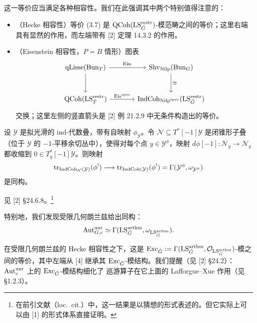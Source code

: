 这一等价应当满足各种相容性。我们在此强调其中两个特别值得注意的：
\begin{itemize}
  \item（Hecke 相容性）等价 (3.7) 是 $\mathrm{QCoh}(\mathrm{LS}^{\mathrm{restr}}_{\check{G}})$-模范畴之间的等价；这里右端具有显然的作用，而左端带有 [2] 定理 14.3.2 的作用。
  \item（Eisenstein 相容性，$P = B$ 情形）图表
  \begin{equation*}
    \begin{tikzcd}[column sep=large, row sep=large]
      \qLisse(\Bun_T) \arrow[r, "\Eis_!"] \arrow[d]
        & \Shv_{\Nilp}(\Bun_G) \arrow[d, "\cong"] \\
      \QCoh(\LS^{\restr}_{\bT}) \arrow[r, "\Eisspec"]
        & \IndCoh_{\Nilp^{\mathrm{spec}}}(\LS^{\restr}_{\bG})
    \end{tikzcd}
  \end{equation*}
  交换；这里左侧的竖直箭头是 [2] 例 21.2.9 中无条件构造出的等价。
\end{itemize}


\begin{prop}
设 $\mathcal{Y}$ 是拟光滑的 ind-代数叠，带有自映射 $\phi_{\mathcal{Y}}$。令
$\mathcal{N} \subseteq T^*[-1]\mathcal{Y}$ 是闭锥形子叠（位于 $\mathcal{Y}$ 的 $-1$-平移余切丛中），使得对每个点
$y \in \mathcal{Y}^\phi$，映射 $d\phi[-1] : \mathcal{N}_y \to \mathcal{N}_y$ 都收缩到 $0 \in T^*_y[-1]\mathcal{Y}$。则映射
\[
  \operatorname{tr}_{\mathrm{IndCoh}_{\mathcal{N}}(\mathcal{Y})}(\phi^!)
  \longrightarrow \operatorname{tr}_{\mathrm{IndCoh}(\mathcal{Y})}(\phi^!)
  = \Gamma(\mathcal{Y}^\phi, \omega_{\mathcal{Y}^\phi})
\]
是同构。
\end{prop}

见 [2] §24.6.8。\footnote{在前引文献（loc.\ cit.）中，这一结果是以猜想的形式表述的。但它实际上可以由 [1] 的形式体系直接证明。}

特别地，我们发现受限几何朗兰兹给出同构：
\begin{equation}
  \operatorname{Aut}^{\mathrm{unr}}_{G,c} \simeq \Gamma(\mathrm{LS}^{\mathrm{arthm}}_{\check{G}}, \omega_{\mathrm{LS}^{\mathrm{arthm}}_{\check{G}}}).
\end{equation}

在受限几何朗兰兹的 Hecke 相容性之下，这是
$\mathrm{Exc}_{\check{G}} := \Gamma(\mathrm{LS}^{\mathrm{arthm}}_{\check{G}}, \mathcal{O}_{\mathrm{LS}^{\mathrm{arthm}}_{\check{G}}})$-模之间的等价，其中左端从 [4] 继承其
$\mathrm{Exc}_{\check{G}}$-模结构。我们提醒（见 [2] §24.2）：$\operatorname{Aut}^{\mathrm{unr}}_c$ 上的 $\mathrm{Exc}_{\check{G}}$-模结构细化了
巡游算子在它上面的 Lafforgue--Xue 作用（见 §1.2.3）。

